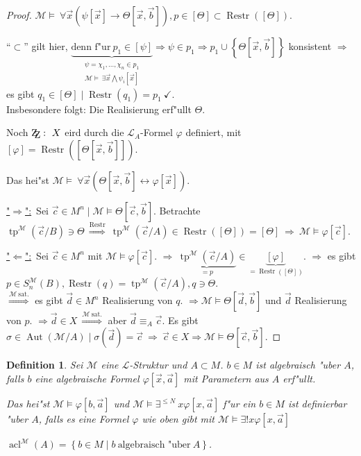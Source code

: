 \documentclass[a4paper,12pt,numbers=noenddot,parskip=full]{scrartcl}
\newcommand{\Forall}{~\forall}
\newcommand{\Exists}{~\exists}
\newcommand{\scrL}{\mathcal{L}}
\newcommand{\scrM}{\mathcal{M}}
\newcommand{\zz}{\mathrm{Z\kern-.3em\raise-0.5ex\hbox{Z}}:~}
\newcommand{\hin}{\underline{"$\Rightarrow$":}~}
\newcommand{\rueck}{\underline{"$\Leftarrow$":}~}
\DeclareMathOperator{\au}{Aut}
\DeclareMathOperator{\rest}{Restr}
\DeclareMathOperator{\acl}{acl}
\DeclareMathOperator{\typ}{tp}
\theoremstyle{dotless}
\newtheorem{definition}[theorem]{Definition}
\begin{document}
\begin{proof}
	$\scrM \models\Forall\vec{x} \left(\psi\left[\vec{x}\right] \rightarrow \Theta\left[\vec{x},\vec{b}\right]\right), p \in [\Theta] \subset \rest\left(\left[\Theta\right]\right)$.
	
	"`$\subset$"' gilt hier, $\underbrace{\text{denn f"ur}~ p_1 \in \left[\psi\right]}_{\substack{\psi = \chi_1, \dots, \chi_n \in p_1\\\scrM \models \Exists \vec{x} \bigwedge \psi_i \left[\vec{x}\right]}} \Rightarrow \psi \in p_1 \Rightarrow p_1 \cup \left\{\Theta \left[\vec{x},\vec{b}\right] \right\}$ konsistent $\Rightarrow$ es gibt $q_1 \in \left[\Theta \right] \mid \rest(q_1)=p_1~ \checkmark$.\\
	Insbesondere folgt: Die Realisierung erf"ullt $\Theta$.
	
	Noch $\zz X$ eird durch die $\scrL_A$-Formel $\varphi$ definiert, mit $[\varphi]=\rest\left(\left[\Theta\left[\vec{x},\vec{b}\right]\right]\right)$.
	
	Das hei"st $\scrM \models \Forall \vec{x} \left(\Theta\left[\vec{x},\vec{b}\right] \leftrightarrow \varphi\left[\vec{x}\right]\right)$.
	
	\hin Sei $\vec{c} \in M^n \mid \scrM \models \Theta\left[\vec{c},\vec{b}\right]$. Betrachte $\typ^\scrM(\vec{c}/B) \ni \Theta~ \overset{\rest}{\Longrightarrow}~ \typ^\scrM\left(\vec{c}/A\right) \in \rest\left(\left[\Theta\right]\right) = \left[\Theta\right]~ \Rightarrow~ \scrM \models \varphi\left[\vec{c}\right]$.
	
	\rueck Sei $\vec{c} \in M^n$ mit $\scrM \models \varphi\left[\vec{c}\right]$. $\Rightarrow~ \underbrace{\typ^\scrM\left(\vec{c}/A\right)}_{=p} \in \underbrace{[\varphi]}_{= \rest\left(\left[\Theta\right]\right)}$. $\Rightarrow$ es gibt $p \in S_n^\scrM(B), \rest(q) = \typ^\scrM \left(\vec{c}/A\right), q \ni \Theta$.\\
	$\overset{\scrM~\text{sat.}}{\Longrightarrow}$ es gibt $\vec{d} \in M^n$ Realisierung von $q$. $\Rightarrow \scrM \models \Theta\left[\vec{d},\vec{b}\right]$ und $\vec{d}$ Realisierung von $p$. $\Rightarrow \vec{d} \in X~ \overset{\scrM~\text{sat.}}{\Longrightarrow}$ aber $\vec{d} \equiv_A \vec{c}$. Es gibt $\sigma \in \au\left(\scrM/A\right) \mid \sigma\left(\vec{d}\right) = \vec{c}~ \Longrightarrow~ \vec{c} \in X \Rightarrow \scrM \models \Theta\left[\vec{c},\vec{b}\right]$.
\end{proof}
\begin{definition}
	Sei $\scrM$ eine $\scrL$-Struktur und $A \subset M$. $b \in M$ ist \emph{algebraisch} "uber $A$, falls $b$ eine algebraische Formel $\varphi\left[\vec{x},\vec{a}\right]$ mit Parametern aus $A$ erf"ullt.
	
	Das hei"st $\scrM \models \varphi\left[b, \vec{a}\right]$ und $\scrM \models \exists^{\leq N}~x \varphi\left[x, \vec{a}\right]$ f"ur ein $b \in M$ ist \emph{definierbar} "uber $A$, falls es eine Formel $\varphi$ wie oben gibt mit $\scrM \models \exists! x \varphi\left[x,\vec{a}\right]$
	
	$\acl^\scrM (A) = \left\{b \in M \mid b~ \text{algebraisch "uber}~ A \right\}$.
\end{definition}
\end{document}
